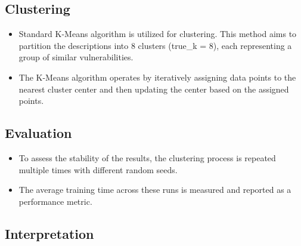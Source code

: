 \documentclass[12pt]{article}
\begin{document}
\subsection{Clustering}

\begin{itemize}

	\item Standard K-Means algorithm is utilized for clustering. This method aims to partition the
	      descriptions into 8 clusters (true\_k = 8), each representing a group of similar
	      vulnerabilities.

	\item The K-Means algorithm operates by iteratively assigning data points to the nearest cluster
	      center and then updating the center based on the assigned points.

\end{itemize}

\subsection{Evaluation}

\begin{itemize}

	\item To assess the stability of the results, the clustering process is repeated multiple times
	      with different random seeds.

	\item The average training time across these runs is measured and reported as a performance
	      metric.

\end{itemize}

\subsection{Interpretation}
\end{document}
